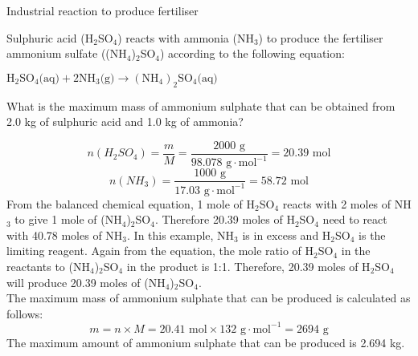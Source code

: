\begin{wex}{Industrial reaction to produce fertiliser}{Sulphuric acid (H$_{2}$SO$_{4}$) reacts with ammonia (NH$_{3}$) to produce the fertiliser ammonium sulfate ((NH$_{4}$)$_{2}$SO$_{4}$) according to the following equation:
\begin{center}
$\text{H}_{2}\text{SO}_{4}\text{(aq)} + 2\text{NH}_{3}\text{(g)} \rightarrow (\text{NH}_{4})_{2}\text{SO}_{4}\text{(aq)}$
\end{center}
What is the maximum mass of ammonium sulphate that can be obtained from 2.0 kg of sulphuric acid and 1.0 kg of ammonia?
}{
\begin{equation*}
n(H_{2}SO_{4}) = \frac{m}{M} = \frac{2000 \text{ g}}{98.078 \text{ g} \cdot \text{mol}^{-1}} = 20.39 \text{ mol}
\end{equation*}
\begin{equation*}
n(NH_{3}) = \frac{1000 \text{ g}}{17.03 \text{ g} \cdot \text{mol}^{-1}} = 58.72 \text{ mol}
\end{equation*}
From the balanced chemical equation, 1 mole of H$_{2}$SO$_{4}$ reacts with 2 moles of NH$_{3}$ to give 1 mole of (NH$_{4}$)$_{2}$SO$_{4}$. Therefore 20.39 moles of H$_{2}$SO$_{4}$ need to react with 40.78 moles of NH$_{3}$. In this example, NH$_{3}$ is in excess and H$_{2}$SO$_{4}$ is the limiting reagent.
Again from the equation, the mole ratio of H$_{2}$SO$_{4}$ in the reactants to (NH$_{4}$)$_{2}$SO$_{4}$ in the product is 1:1. Therefore, 20.39 moles of H$_{2}$SO$_{4}$ will produce 20.39 moles of (NH$_{4}$)$_{2}$SO$_{4}$.\\

The maximum mass of ammonium sulphate that can be produced is calculated as follows:
\begin{equation*}
m = n \times M = 20.41 \text{ mol} \times 132 \text{ g} \cdot \text{mol}^{-1} = 2694 \text{ g}
\end{equation*}
The maximum amount of ammonium sulphate that can be produced is 2.694 kg.
}
\end{wex}
\pagebreak
